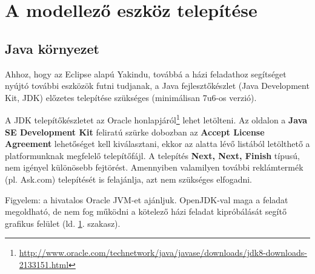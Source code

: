 \section{A modellező eszköz telepítése}
\label{sec:modellezo-eszkoz-telepitese}

\subsection{Java környezet}
Ahhoz, hogy az Eclipse alapú Yakindu, továbbá a házi feladathoz segítséget nyújtó további eszközök futni tudjanak, a Java fejlesztőkészlet (Java Development Kit, JDK) előzetes telepítése szükséges (minimálisan 7u6-os verzió).

A JDK telepítőkészletet az Oracle honlapjáról\footnote{\url{http://www.oracle.com/technetwork/java/javase/downloads/jdk8-downloads-2133151.html}} lehet letölteni. Az oldalon a \textbf{Java SE Development Kit} feliratú szürke dobozban az \textbf{Accept License Agreement} lehetőséget kell kiválasztani, ekkor az alatta lévő listából letölthető a platformunknak megfelelő telepítőfájl. A telepítés \textbf{Next, Next, Finish} típusú, nem igényel különösebb fejtörést. Amennyiben valamilyen további reklámtermék (pl. Ask.com) telepítését is felajánlja, azt nem szükséges elfogadni.

\begin{megjegyzes}
Figyelem: a hivatalos Oracle JVM-et ajánljuk. OpenJDK-val maga a feladat megoldható, de nem fog működni a kötelező házi feladat kipróbálását segítő grafikus felület (ld. \ref{sec:modellezo-eszkoz-telepitese}. szakasz).
\end{megjegyzes}


\begin{comment}
Telepítés után érdemes beállítani a \codeEsc{JAVA\_HOME} változót, valamint hozzáadni a Java elérési útját a PATH-hoz. Ehhez Windowson a követketzőt kell tenni.

\begin{itemize}
\item A számítógép ikonra jobb gombal kattintva válasszuk a \textbf{Properties} (Tulajdonságok) lehetőséget. (Elérhető a \textbf{Control Panel} | \textbf{System and Security} | \textbf{System} úton is.)
\item A bal oldali menü lehetőségei közül kattintsunk az \\textbf{Advanced System Settings}-re.
\item Itt nyomjunk rá az \textbf{Environment Variables} gombra.
\item Ha még nincs \codeEsc{JAVA_HOME} változó, létre kell hozni. \codeEsc{JAVA_HOME} legyen a neve, az értéke pedig a frissen installált Java könyvtár elérési útja. Ha szóközöket tartalmaz, érdemes rövidítéseket használni, pl. \codeEsc{C:\Progra~1\Java\jdk1.8.0\_31}
\item Jelöljük ki a \codeEsc{Path} változót, majd \textbf{Edit}. A változó jelenlegi értékét ne töröljük ki, csak írjunk a végére egy pontosvesszőt, majd a JDK-n belüli bin könyvtár elérési útját.
\end{itemize}
\end{comment}

